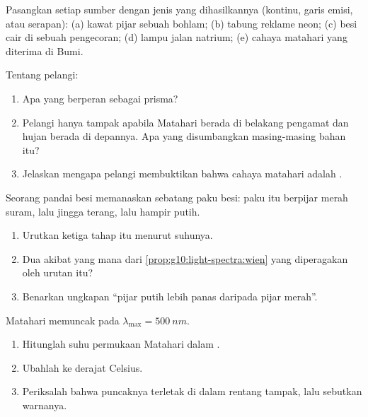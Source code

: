 \begin{exercise}[$\star$]\label{exo:g10:light-spectra:3}
Pasangkan setiap sumber dengan jenis  yang dihasilkannya
(kontinu, garis emisi, atau serapan): (a) kawat pijar sebuah bohlam;
(b) tabung reklame neon; (c) besi cair di sebuah pengecoran; (d) lampu
jalan natrium; (e) cahaya matahari yang diterima di Bumi.
\end{exercise}

\begin{exercise}[$\star$]\label{exo:g10:light-spectra:4}
Tentang pelangi:
\begin{enumerate}
  \item Apa yang berperan sebagai prisma?
  \item Pelangi hanya tampak apabila Matahari berada di belakang
        pengamat dan hujan berada di depannya. Apa yang disumbangkan
        masing-masing bahan itu?
  \item Jelaskan mengapa pelangi membuktikan bahwa cahaya matahari
        adalah .
\end{enumerate}
\end{exercise}

\begin{exercise}[$\star$]\label{exo:g10:light-spectra:5}
Seorang pandai besi memanaskan sebatang paku besi: paku itu berpijar
merah suram, lalu jingga terang, lalu hampir putih.
\begin{enumerate}
  \item Urutkan ketiga tahap itu menurut suhunya.
  \item Dua akibat yang mana dari \cref{prop:g10:light-spectra:wien}
        yang diperagakan oleh urutan itu?
  \item Benarkan ungkapan ``pijar putih lebih panas daripada pijar
        merah''.
\end{enumerate}
\end{exercise}

\begin{exercise}[$\star\star$]\label{exo:g10:light-spectra:6}
 Matahari memuncak pada $\lambda_{\max} = \qty{500}{nm}$.
\begin{enumerate}
  \item Hitunglah suhu permukaan Matahari dalam .
  \item Ubahlah ke derajat Celsius.
  \item Periksalah bahwa puncaknya terletak di dalam rentang tampak,
        lalu sebutkan warnanya.
\end{enumerate}
\end{exercise}


